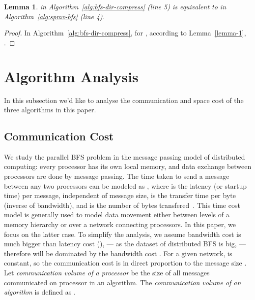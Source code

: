 \documentclass[conference]{IEEEtran}
\newtheorem{lemma}[theorem]{Lemma}
\begin{document}
\begin{lemma} \label{lemma-2}  in Algorithm~\ref{alg:bfs-dir-compress} (line 5) is equivalent to  in Algorithm~\ref{alg:spmv-bfs} (line 4).
\end{lemma}
\begin{proof}
  In Algorithm~\ref{alg:bfs-dir-compress}, for , according to Lemma~\ref{lemma-1}, .
\end{proof}




















\section{Algorithm Analysis}
\label{sec:ana}
In this subsection we'd like to analyse the communication and space cost of
the three algorithms in this paper.

\subsection{Communication Cost}
\label{sec:model}
We study the parallel BFS problem in the message passing model of distributed
computing: every processor has its own local memory, and data exchange between
processors are done by message passing. The time taken to send a message
between any two processors can be modeled as , where
 is the latency (or startup time) per message, independent of message
size,  is the transfer time per byte (inverse of bandwidth), and  is
the number of bytes transfered~\cite{Kumar:2002}. This time cost model is
generally used to model data movement either between levels of a memory
hierarchy or over a network connecting processors. In this paper, we focus on
the latter case. To simplify the analysis, we assume bandwidth cost is much
bigger than latency cost (), --- as the dataset of
distributed BFS is big, --- therefore  will be dominated by the
bandwidth cost . For a given network,  is constant, so the
communication cost is in direct proportion to the message size .
Let \textit{communication volume of a processor}  be the size
of all messages communicated on processor  in an algorithm. The
\textit{communication volume of an algorithm} is defined as .
\end{document}
